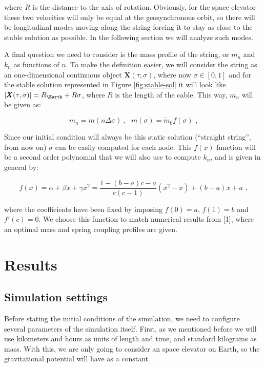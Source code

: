 \documentclass[8 pt, twocolumn]{article}
\renewcommand{\vec}[1]{\pmb{#1}}
\begin{document}
where $R$ is the distance to the axis of rotation. Obviously, for the space elevator these two velocities will only be equal at the geosynchronous orbit, so there will be longitudinal modes moving along the string forcing it to stay as close to the stable solution as possible. In the following section we will analyze such modes.

A final question we need to consider is the mass profile of the string, or $m_n$ and $k_n$ as functions of $n$. To make the definition easier, we will consider the string as an one-dimensional continuous object $\vec{X}(\tau,\sigma)$, where now $\sigma \in [0, 1]$ and for the stable solution represented in Figure \ref{fig:stable-sol} it will look like $|\vec{X}(\tau,\sigma)| = R_\Earth + R \sigma$, where $R$ is the length of the cable. This way, $m_n$ will be given as:

\begin{equation}
  m_n = m(n\Delta\sigma) ~, ~~~ m(\sigma) = \tilde m_0 f(\sigma) \text{ ,}
\end{equation}

Since our initial condition will always be this static solution (``straight string'', from now on) $\sigma$ can be easily computed for each node. This $f(x)$ function will be a second order polynomial that we will also use to compute $k_n$, and is given in general by:

\begin{equation}
  f(x) = \alpha + \beta x + \gamma x^2 = \frac{1-(b-a)c - a}{c(c-1)} (x^2-x)+(b-a)x +a \text{ ,}
\end{equation}

where the coefficients have been fixed by imposing $f(0) = a$, $f(1) = b$ and $f'(c)=0$. We choose this function to match numerical results from [1], where an optimal mass and spring coupling profiles are given.

\section{Results}

\subsection{Simulation settings}

Before stating the initial conditions of the simulation, we need to configure several parameters of the simulation itself. First, as we mentioned before we will use kilometers and hours as units of length and time, and standard kilograms as mass. With this, we are only going to consider an space elevator on Earth, so the gravitational potential will have as a constant
\end{document}
